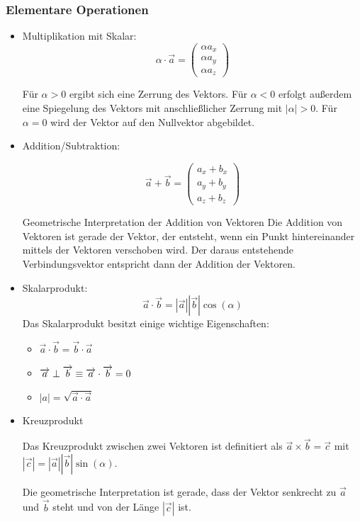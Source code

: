 \documentclass[a4paper,10pt]{scrartcl}
\begin{document}
\subsubsection{Elementare Operationen}
\begin{itemize}
\item Multiplikation mit Skalar: 
\[
 \alpha \cdot \vec a=\begin{pmatrix} \alpha a_x \\ \alpha a_y \\ \alpha a_z \end{pmatrix}
\]

Für $\alpha>0$ ergibt sich eine Zerrung des Vektors.  Für $\alpha<0$ erfolgt außerdem eine Spiegelung des Vektors mit anschließlicher Zerrung mit $|\alpha|>0$.  Für $\alpha=0$ wird der Vektor auf den Nullvektor abgebildet.

\item Addition/Subtraktion:

\[
 \vec a + \vec b = \begin{pmatrix} a_x+b_x \\ a_y+b_y\\ a_z+b_z \end{pmatrix}
\]
\begin{seg}{Geometrische Interpretation der Addition von Vektoren}
 Die Addition von Vektoren ist gerade der Vektor, der entsteht, wenn ein Punkt hintereinander mittels der Vektoren verschoben wird. Der daraus entstehende Verbindungsvektor entspricht dann der Addition der Vektoren.
\end{seg}


\item Skalarprodukt:
\[
 \vec a \cdot \vec b= |\vec a| |\vec b| \cos(\alpha)
\]
Das Skalarprodukt besitzt einige wichtige Eigenschaften:
\begin{itemize}
 \item $\vec a \cdot \vec b = \vec b \cdot \vec a$
 \item $\overrightarrow{a} \perp \overrightarrow{b} \equiv \overrightarrow{a} \cdot \overrightarrow{b} =0$
 \item $|a|=\sqrt{\vec a \cdot \vec a}$
\end{itemize}
\item Kreuzprodukt

Das Kreuzprodukt zwischen zwei Vektoren ist definitiert als $\vec a \times \vec b = \vec c$ mit $|\vec c|= |\vec a| |\vec b| \sin(\alpha)$.

Die geometrische Interpretation ist gerade, dass der Vektor senkrecht zu $\vec a$ und $\vec b$ steht und von der Länge $|\vec c|$ ist.


\end{itemize}
\end{document}

